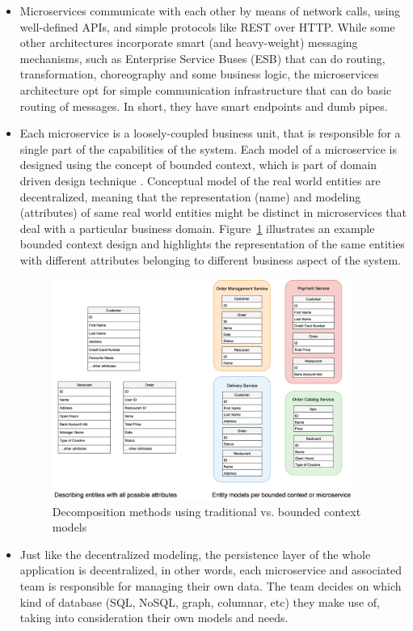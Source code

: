 \documentclass{Configuration_Files/PoliMi3i_thesis}
\begin{document}
\begin{itemize}
    \item Microservices communicate with each other by means of network calls, using well-defined APIs, and simple protocols like REST over HTTP. While some other architectures incorporate smart (and heavy-weight) messaging mechanisms, such as Enterprise Service Buses (ESB) that can do routing, transformation, choreography and some business logic, the microservices architecture opt for simple communication infrastructure that can do basic routing of messages. In short, they have smart endpoints and dumb pipes.
    
    \item Each microservice is a loosely-coupled business unit, that is responsible for a single part of the capabilities of the system.
    Each model of a microservice is designed using the concept of bounded context, which is part of domain driven design technique \cite{boundedcontext}. Conceptual model of the real world entities are decentralized, meaning that the representation (name) and modeling (attributes) of same real world entities might be distinct in microservices that deal with a particular business domain. Figure~\ref{fig:context} illustrates an example bounded context design and highlights the representation of the same entities with different attributes belonging to different business aspect of the system.
    
    \begin{figure}[H]
    \centering
    \includegraphics[width=0.93\textwidth]{myImages/context.png}
    \caption{Decomposition methods using traditional vs. bounded context models}
    \label{fig:context}
    \end{figure}

    \item Just like the decentralized modeling, the persistence layer of the whole application is decentralized, in other words, each microservice and associated team is responsible for managing their own data. The team decides on which kind of database (SQL, NoSQL, graph, columnar, etc) they make use of, taking into consideration their own models and needs.

\end{itemize}
\end{document}
